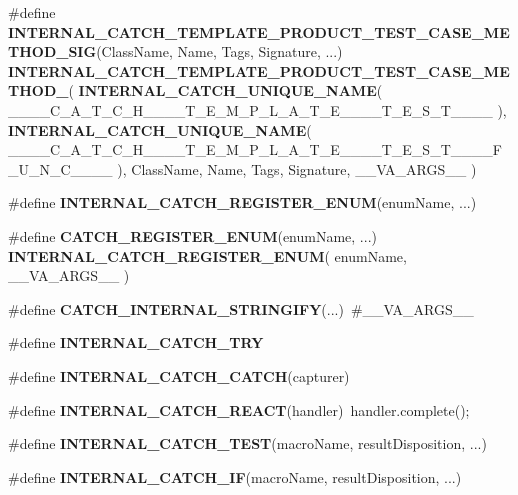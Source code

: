 \begin{DoxyCompactItemize}
\item 
\#define \textbf{ I\+N\+T\+E\+R\+N\+A\+L\+\_\+\+C\+A\+T\+C\+H\+\_\+\+T\+E\+M\+P\+L\+A\+T\+E\+\_\+\+P\+R\+O\+D\+U\+C\+T\+\_\+\+T\+E\+S\+T\+\_\+\+C\+A\+S\+E\+\_\+\+M\+E\+T\+H\+O\+D\+\_\+\+S\+IG}(Class\+Name,  Name,  Tags,  Signature, ...)~\textbf{ I\+N\+T\+E\+R\+N\+A\+L\+\_\+\+C\+A\+T\+C\+H\+\_\+\+T\+E\+M\+P\+L\+A\+T\+E\+\_\+\+P\+R\+O\+D\+U\+C\+T\+\_\+\+T\+E\+S\+T\+\_\+\+C\+A\+S\+E\+\_\+\+M\+E\+T\+H\+O\+D\+\_}( \textbf{ I\+N\+T\+E\+R\+N\+A\+L\+\_\+\+C\+A\+T\+C\+H\+\_\+\+U\+N\+I\+Q\+U\+E\+\_\+\+N\+A\+ME}( \+\_\+\+\_\+\+\_\+\+\_\+\+C\+\_\+\+A\+\_\+\+T\+\_\+\+C\+\_\+\+H\+\_\+\+\_\+\+\_\+\+\_\+\+T\+\_\+\+E\+\_\+\+M\+\_\+\+P\+\_\+\+L\+\_\+\+A\+\_\+\+T\+\_\+\+E\+\_\+\+\_\+\+\_\+\+\_\+\+T\+\_\+\+E\+\_\+\+S\+\_\+\+T\+\_\+\+\_\+\+\_\+\+\_\+ ), \textbf{ I\+N\+T\+E\+R\+N\+A\+L\+\_\+\+C\+A\+T\+C\+H\+\_\+\+U\+N\+I\+Q\+U\+E\+\_\+\+N\+A\+ME}( \+\_\+\+\_\+\+\_\+\+\_\+\+C\+\_\+\+A\+\_\+\+T\+\_\+\+C\+\_\+\+H\+\_\+\+\_\+\+\_\+\+\_\+\+T\+\_\+\+E\+\_\+\+M\+\_\+\+P\+\_\+\+L\+\_\+\+A\+\_\+\+T\+\_\+\+E\+\_\+\+\_\+\+\_\+\+\_\+\+T\+\_\+\+E\+\_\+\+S\+\_\+\+T\+\_\+\+\_\+\+\_\+\+\_\+\+F\+\_\+\+U\+\_\+\+N\+\_\+\+C\+\_\+\+\_\+\+\_\+\+\_\+ ), Class\+Name, Name, Tags, Signature, \+\_\+\+\_\+\+V\+A\+\_\+\+A\+R\+G\+S\+\_\+\+\_\+ )
\item 
\#define \textbf{ I\+N\+T\+E\+R\+N\+A\+L\+\_\+\+C\+A\+T\+C\+H\+\_\+\+R\+E\+G\+I\+S\+T\+E\+R\+\_\+\+E\+N\+UM}(enum\+Name, ...)
\item 
\#define \textbf{ C\+A\+T\+C\+H\+\_\+\+R\+E\+G\+I\+S\+T\+E\+R\+\_\+\+E\+N\+UM}(enum\+Name, ...)~\textbf{ I\+N\+T\+E\+R\+N\+A\+L\+\_\+\+C\+A\+T\+C\+H\+\_\+\+R\+E\+G\+I\+S\+T\+E\+R\+\_\+\+E\+N\+UM}( enum\+Name, \+\_\+\+\_\+\+V\+A\+\_\+\+A\+R\+G\+S\+\_\+\+\_\+ )
\item 
\#define \textbf{ C\+A\+T\+C\+H\+\_\+\+I\+N\+T\+E\+R\+N\+A\+L\+\_\+\+S\+T\+R\+I\+N\+G\+I\+FY}(...)~\#\+\_\+\+\_\+\+V\+A\+\_\+\+A\+R\+G\+S\+\_\+\+\_\+
\item 
\#define \textbf{ I\+N\+T\+E\+R\+N\+A\+L\+\_\+\+C\+A\+T\+C\+H\+\_\+\+T\+RY}
\item 
\#define \textbf{ I\+N\+T\+E\+R\+N\+A\+L\+\_\+\+C\+A\+T\+C\+H\+\_\+\+C\+A\+T\+CH}(capturer)
\item 
\#define \textbf{ I\+N\+T\+E\+R\+N\+A\+L\+\_\+\+C\+A\+T\+C\+H\+\_\+\+R\+E\+A\+CT}(handler)~handler.\+complete();
\item 
\#define \textbf{ I\+N\+T\+E\+R\+N\+A\+L\+\_\+\+C\+A\+T\+C\+H\+\_\+\+T\+E\+ST}(macro\+Name,  result\+Disposition, ...)
\item 
\#define \textbf{ I\+N\+T\+E\+R\+N\+A\+L\+\_\+\+C\+A\+T\+C\+H\+\_\+\+IF}(macro\+Name,  result\+Disposition, ...)

\end{DoxyCompactItemize}
